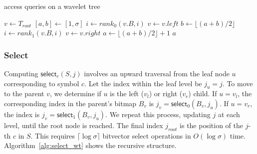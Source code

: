 \begin{algorithm}[h!]
    \caption{\textsf{access} queries on a wavelet tree}\label{alg:access_wt}
    \begin{algorithmic}
         
        \State $v \gets T_{root}$ 
        \State $[a,b] \gets [1,\sigma]$
         
        \State $i \gets rank_0(v.B,i)$
        \State $v \gets v.left$ 
        \State $b \gets \lfloor (a+b)/2 \rfloor$
        \Else
        \State $i \gets rank_1(v.B,i)$
        \State $v \gets v.right$ 
        \State $a \gets \lfloor (a+b)/2 \rfloor +1$
        \EndIf
        \EndWhile
        \State \Return $a$
        \EndFunction
    \end{algorithmic}
\end{algorithm}

\subsubsection{Select}
Computing $\textsf{select}_c(S, j)$ involves an upward traversal from the leaf node $u$ corresponding to symbol $c$. Let the index within the leaf level be $j_u = j$. To move to the parent $v$, we determine if $u$ is the left ($v_l$) or right ($v_r$) child. If $u = v_l$, the corresponding index in the parent's bitmap $B_v$ is $j_v = \textsf{select}_0(B_v, j_u)$. If $u = v_r$, the index is $j_v = \textsf{select}_1(B_v, j_u)$. We repeat this process, updating $j$ at each level, until the root node is reached. The final index $j_{root}$ is the position of the $j$-th $c$ in $S$. This requires $\lceil \log \sigma \rceil$ bitvector \textsf{select} operations in $O(\log \sigma)$ time. Algorithm~\ref{alg:select_wt} shows the recursive structure.

